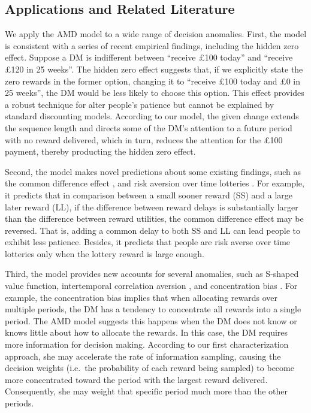 \documentclass[
  12pt,
]{article}
\begin{document}
\hypertarget{applications-and-related-literature}{%
\subsection{Applications and Related
Literature}\label{applications-and-related-literature}}

We apply the AMD model to a wide range of decision anomalies. First, the
model is consistent with a series of recent empirical findings,
including the hidden zero effect. Suppose a DM is indifferent between
``receive £100 today'' and ``receive £120 in 25 weeks''. The hidden zero
effect suggests that, if we explicitly state the zero rewards in the
former option, changing it to ``receive £100 today and £0 in 25 weeks'',
the DM would be less likely to choose this option. This effect provides
a robust technique for alter people's patience but cannot be explained
by standard discounting models. According to our model, the given change
extends the sequence length and directs some of the DM's attention to a
future period with no reward delivered, which in turn, reduces the
attention for the £100 payment, thereby producting the hidden zero
effect.

Second, the model makes novel predictions about some existing findings,
such as the common difference effect \citep{loewenstein1992anomalies},
and risk aversion over time lotteries
\citep{onay2007intertemporal, dejarnette2020time}. For example, it
predicts that in comparison between a small sooner reward (SS) and a
large later reward (LL), if the difference between reward delays is
substantially larger than the difference between reward utilities, the
common difference effect may be reversed. That is, adding a common delay
to both SS and LL can lead people to exhibit less patience. Besides, it
predicts that people are risk averse over time lotteries only when the
lottery reward is large enough.

Third, the model provides new accounts for several anomalies, such as
S-shaped value function, intertemporal correlation aversion
\citep{andersen2018multiattribute, rohde2023intertemporal}, and
concentration bias \citep{dertwinkel2022concentration}. For example, the
concentration bias implies that when allocating rewards over multiple
periods, the DM has a tendency to concentrate all rewards into a single
period. The AMD model suggests this happens when the DM does not know or
knows little about how to allocate the rewards. In this case, the DM
requires more information for decision making. According to our first
characterization approach, she may accelerate the rate of information
sampling, causing the decision weights (i.e.~the probability of each
reward being sampled) to become more concentrated toward the period with
the largest reward delivered. Consequently, she may weight that specific
period much more than the other periods.
\end{document}
